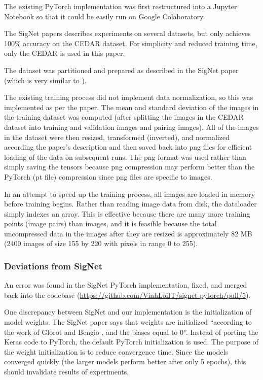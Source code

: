 The existing PyTorch implementation was first restructured into a Jupyter Notebook so that it could be easily run on Google Colaboratory.

The SigNet papers describes experiments on several datasets, but only achieves 100\% accuracy on the CEDAR dataset.
For simplicity and reduced training time, only the CEDAR is used in this paper.

The dataset was partitioned and prepared as described in the SigNet paper (which is very similar to \cite{LeCun}).

The existing training process did not implement data normalization, so this was implemented as per the paper.
The mean and standard deviation of the images in the training dataset was computed (after splitting the images in the CEDAR dataset into training and validation images and pairing images).
All of the images in the dataset were then resized, transformed (inverted), and normalized according the paper's description and then saved back into png files for efficient loading of the data on subsequent runs.
The png format was used rather than simply saving the tensors because png compression may perform better than the PyTorch (pt file) compression since png files are specific to images.

In an attempt to speed up the training process, all images are loaded in memory before training begins.
Rather than reading image data from disk, the dataloader simply indexes an array.
This is effective because there are many more training points (image pairs) than images, and it is feasible because the total uncompressed data in the images after they are resized is approximately 82 MB (2400 images of size 155 by 220 with pixels in range 0 to 255).

\subsubsection{Deviations from SigNet}
An error was found in the SigNet PyTorch implementation, fixed, and merged back into the codebase (\url{https://github.com/VinhLoiIT/signet-pytorch/pull/5}).

One discrepancy between SigNet and our implementation is the initialization of model weights.
The SigNet paper says that weights are initialized ``according to the work
of Glorot and Bengio \cite{glorot_bengio}, and the biases equal to 0''\cite{sig_net}.
Instead of porting the Keras code to PyTorch, the default PyTorch initialization is used.
The purpose of the weight initialization is to reduce convergence time.
Since the models converged quickly (the larger models perform better after only 5 epochs), this should invalidate results of experiments.

